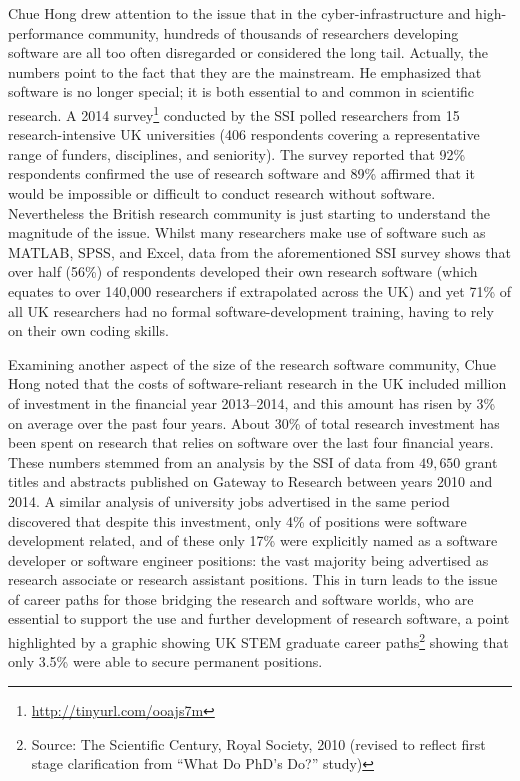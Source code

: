 \documentclass[11pt, oneside]{amsart}
\begin{document}
Chue Hong drew attention to the issue that in the cyber-infrastructure and
high-performance community, hundreds of thousands
of researchers developing software are all too often disregarded or considered the long tail.
Actually, the numbers point to the fact that they are the mainstream. %
He emphasized that software is no longer special; it is both essential to and
common in scientific research. A 2014
survey\footnote{\url{http://tinyurl.com/ooajs7m}}
conducted by the SSI polled researchers from 15 research-intensive UK
universities (406 respondents covering a representative range of funders,
disciplines, and seniority). The survey reported that 92\% respondents confirmed the use of research
software and 89\% affirmed that it would be impossible or difficult to conduct
research without software. Nevertheless the British research community is just
starting to understand the magnitude of the issue. Whilst many researchers make
use of software such as MATLAB, SPSS, and Excel, data from the aforementioned
SSI survey shows that over half (56\%) of respondents developed their own
research software (which equates to over 140,000 researchers if extrapolated
across the UK) and yet 71\% of all UK researchers had no formal software-development training, having
to rely on their own coding skills.

Examining another aspect of the size of the research software community,
Chue Hong noted that the costs of software-reliant research in the UK
included  million of investment in the financial year
2013--2014, and this amount has risen by 3\% on average over the past four
years. About 30\% of total research investment has been spent on research that
relies on software over the last four financial years. These numbers stemmed
from an analysis by the SSI of data from $49,650$ grant titles and abstracts published on
Gateway to Research between years 2010 and 2014. A similar analysis of university
jobs advertised in the same period discovered that despite this investment, only
4\% of positions were software development related, and of these only 17\% were
explicitly named as a software developer or software engineer positions: the vast
majority being advertised as research associate or research assistant positions.
This in turn leads to the issue of career paths for those bridging the research
and software worlds, who are essential to support the use and further
development of research software, a point highlighted by a graphic showing UK
STEM graduate career paths\footnote{Source: The Scientific Century, Royal
Society, 2010 (revised to reflect first stage clarification from ``What Do PhD's
Do?'' study)} showing that only 3.5\% were able to secure permanent positions.
\end{document}
